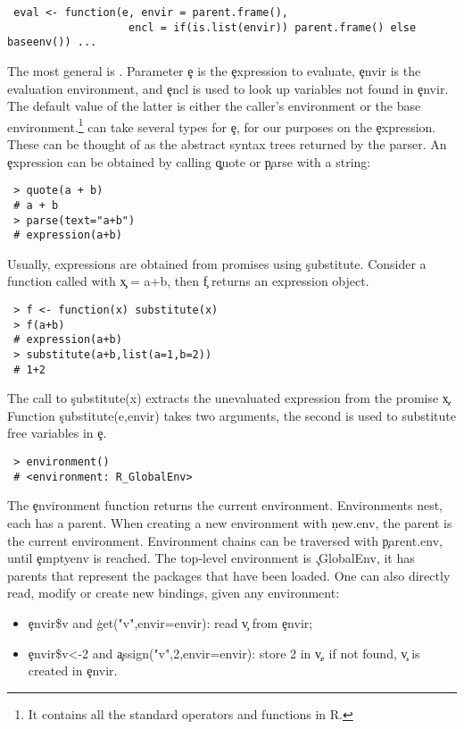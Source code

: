 \documentclass[review,nonacm,screen,acmsmall,anonymous=true]{acmart}
\begin{document}
\begin{lstlisting}
 eval <- function(e, envir = parent.frame(),
                   encl = if(is.list(envir)) parent.frame() else baseenv()) ...
\end{lstlisting}
The most general is \eval. Parameter \c e is the \c{expression} to evaluate,
\c{envir} is the evaluation environment, and \c{encl} is used to look up
variables not found in \c{envir}. The default value of the latter is either the
caller's environment or the base environment.\footnote{It contains all the standard operators and functions in R.} \Eval can take several types for \c e, for
our purposes on the \c{expression}. These can be thought of as the abstract
syntax trees returned by the parser. An \c{expression} can be obtained by
calling \c{quote} or \c{parse} with a string:
\begin{lstlisting}
 > quote(a + b)
 # a + b
 > parse(text="a+b")
 # expression(a+b)
\end{lstlisting}
Usually, expressions are obtained from promises using \c{substitute}. Consider a
function called with \c{x = a+b}, then \c f returns an expression object.
\begin{lstlisting}
 > f <- function(x) substitute(x)
 > f(a+b)
 # expression(a+b)
 > substitute(a+b,list(a=1,b=2))
 # 1+2
\end{lstlisting}
The call to \c{substitute(x)} extracts the unevaluated expression from the
promise \c x. Function \c{substitute(e,envir)} takes two arguments, the second
is used to substitute free variables in \c e.
\begin{lstlisting}
 > environment()
 # <environment: R_GlobalEnv>
\end{lstlisting}
The \c{environment} function returns the current environment. Environments nest,
each has a parent. When creating a new environment with \c{new.env}, the parent
is the current environment. Environment chains can be traversed with
\c{parent.env}, until \c{emptyenv} is reached. The top-level environment is
\c{.GlobalEnv}, it has parents that represent the packages that have been
loaded. One can also directly read, modify or create new bindings, given any
environment:
\begin{itemize}
\item \c{envir\$v} and \c{get("v",envir=envir)}: read  \c{v} from \c{envir};
\item \c{envir\$v<-2} and \c{assign("v",2,envir=envir)}: store 2 in \c{v}, if
  not found, \c{v} is created in \c{envir}.
\end{itemize}
\end{document}

